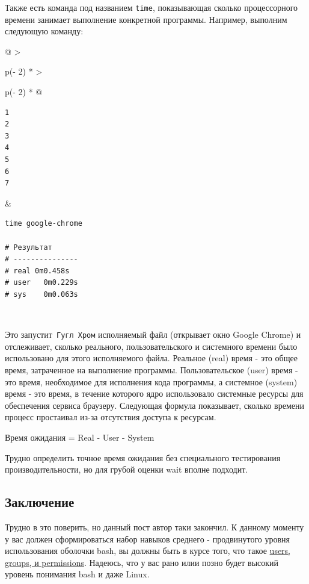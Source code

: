 \documentclass{report}
\begin{document}
Также есть команда под названием \texttt{time}, показывающая сколько
процессорного времени занимает выполнение конкретной программы.
Например, выполним следующую команду:

\begin{longtable}[]{@{}
  >{\raggedright\arraybackslash}p{(\columnwidth - 2\tabcolsep) * }
  >{\raggedright\arraybackslash}p{(\columnwidth - 2\tabcolsep) * }@{}}
\toprule
\endhead
\begin{minipage}[t]{\linewidth}\raggedright
\begin{verbatim}
1
2
3
4
5
6
7
\end{verbatim}
\end{minipage} & \begin{minipage}[t]{\linewidth}\raggedright
\begin{verbatim}
time google-chrome

# Результат
# ---------------
# real 0m0.458s
# user   0m0.229s
# sys    0m0.063s
\end{verbatim}
\end{minipage} \\ \addlinespace
\bottomrule
\end{longtable}

Это запустит\texttt{\ Гугл\ Хром} исполняемый файл (открывает окно
Google Chrome) и отслеживает, сколько реального, пользовательского и
системного времени было использовано для этого исполняемого файла.
Реальное (real) время - это общее время, затраченное на выполнение
программы. Пользовательское (user) время - это время, необходимое для
исполнения кода программы, а системное (system) время - это время, в
течение которого ядро использовало системные ресурсы для обеспечения
сервиса браузеру. Следующая формула показывает, сколько времени процесс
простаивал из-за отсутствия доступа к ресурсам.

Время ожидания = Real - User - System

Трудно определить точное время ожидания без специального тестирования
производительности, но для грубой оценки wait вполне подходит.

\hypertarget{Conclusion}{%
\subsection{\texorpdfstring{\protect\hyperlink{Conclusion}{}Заключение}{Заключение}}\label{Conclusion}}

Трудно в это поверить, но данный пост автор таки закончил. К данному
моменту у вас должен сформироваться набор навыков среднего -
продвинутого уровня использования оболочки bash, вы должны быть в курсе
того, что такое \href{blog/2019/user-permissions/}{users, groups, и
permissions}. Надеюсь, что у вас рано илии позно будет высокий уровень
понимания bash и даже Linux.
\end{document}
